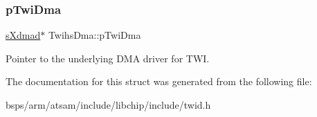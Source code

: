 \subsubsection{\texorpdfstring{pTwiDma}{pTwiDma}}
{\footnotesize\ttfamily \mbox{\hyperlink{group__dmad__structs_gaf2c13151514615a6beb35c0d868a5053}{s\+Xdmad}}$\ast$ Twihs\+Dma\+::p\+Twi\+Dma}

Pointer to the underlying D\+MA driver for T\+WI. 

The documentation for this struct was generated from the following file\+:\begin{DoxyCompactItemize}
\item 
bsps/arm/atsam/include/libchip/include/twid.\+h\end{DoxyCompactItemize}
